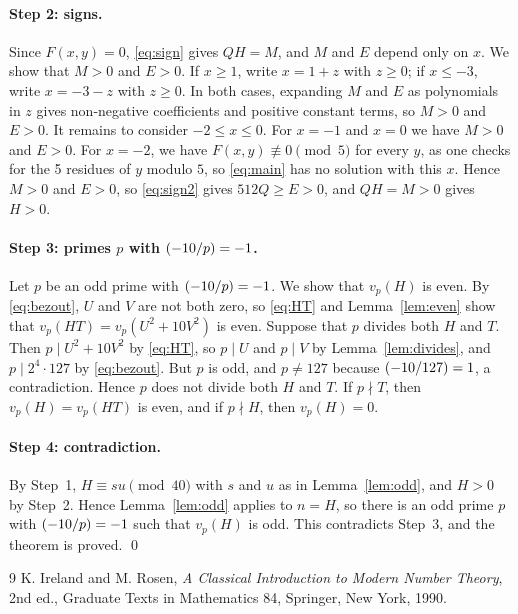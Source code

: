 \documentclass[11pt]{article}
\newcommand{\leg}[2]{\mathchoice{\biggl(\dfrac{#1}{#2}\biggr)}{(#1/#2)}{(#1/#2)}{(#1/#2)}}
\begin{document}
\paragraph{Step 2: signs.} Since $F(x,y)=0$, \eqref{eq:sign} gives $QH=M$, and $M$ and $E$ depend only on $x$. We show that $M>0$ and $E>0$. If $x\geq1$, write $x=1+z$ with $z\geq0$; if $x\leq-3$, write $x=-3-z$ with $z\geq0$. In both cases, expanding $M$ and $E$ as polynomials in $z$ gives non-negative coefficients and positive constant terms, so $M>0$ and $E>0$. It remains to consider $-2\leq x\leq0$. For $x=-1$ and $x=0$ we have $M>0$ and $E>0$. For $x=-2$, we have $F(x,y)\not\equiv0\pmod{5}$ for every $y$, as one checks for the 5 residues of $y$ modulo $5$, so \eqref{eq:main} has no solution with this $x$. Hence $M>0$ and $E>0$, so \eqref{eq:sign2} gives $512Q\geq E>0$, and $QH=M>0$ gives $H>0$.

\paragraph{\texorpdfstring{Step 3: primes $p$ with $\leg{-10}{p}=-1$.}{Step 3: inert primes.}} Let $p$ be an odd prime with $\leg{-10}{p}=-1$. We show that $v_p(H)$ is even. By \eqref{eq:bezout}, $U$ and $V$ are not both zero, so \eqref{eq:HT} and Lemma~\ref{lem:even} show that $v_p(HT)=v_p(U^2+10V^2)$ is even. Suppose that $p$ divides both $H$ and $T$. Then $p\mid U^2+10V^2$ by \eqref{eq:HT}, so $p\mid U$ and $p\mid V$ by Lemma~\ref{lem:divides}, and $p\mid 2^{4}\cdot 127$ by \eqref{eq:bezout}. But $p$ is odd, and $p\neq127$ because $\leg{-10}{127}=1$, a contradiction. Hence $p$ does not divide both $H$ and $T$. If $p\nmid T$, then $v_p(H)=v_p(HT)$ is even, and if $p\nmid H$, then $v_p(H)=0$.

\paragraph{Step 4: contradiction.} By Step~1, $H\equiv su\pmod{40}$ with $s$ and $u$ as in Lemma~\ref{lem:odd}, and $H>0$ by Step~2. Hence Lemma~\ref{lem:odd} applies to $n=H$, so there is an odd prime $p$ with $\leg{-10}{p}=-1$ such that $v_p(H)$ is odd. This contradicts Step~3, and the theorem is proved.
\qed

\begin{thebibliography}{9}
 K. Ireland and M. Rosen, \emph{A Classical Introduction to Modern Number Theory}, 2nd ed., Graduate Texts in Mathematics 84, Springer, New York, 1990.
\end{thebibliography}
\end{document}
